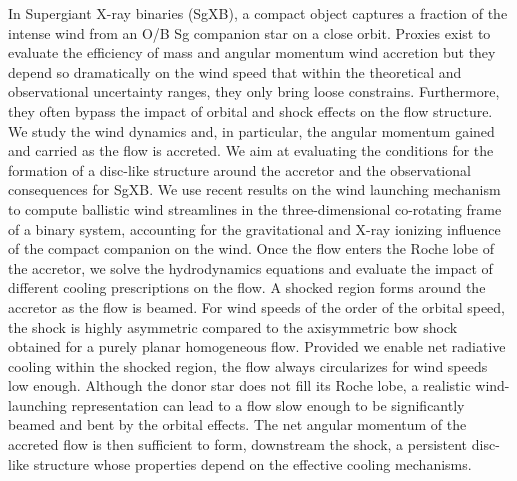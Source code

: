 \documentclass{aa}
\newcommand{\sgx}{SgXB\xspace}
\begin{document}
  \abstract
   {In Supergiant X-ray binaries (\sgx), a compact object captures a fraction of the intense wind from an O/B Sg companion star on a close orbit. Proxies exist to evaluate the efficiency of mass and angular momentum wind accretion but they depend so dramatically on the wind speed that within the theoretical and observational uncertainty ranges, they only bring loose constrains. Furthermore, they often bypass the impact of orbital and shock effects on the flow structure.
}
   {We study the wind dynamics and, in particular, the angular momentum gained and carried as the flow is accreted. We aim at evaluating the conditions for the formation of a disc-like structure around the accretor and the observational consequences for \sgx. 
}
   {We use recent results on the wind launching mechanism to compute ballistic wind streamlines in the three-dimensional co-rotating frame of a binary system, accounting for the gravitational and X-ray ionizing influence of the compact companion on the wind. Once the flow enters the Roche lobe of the accretor, we solve the hydrodynamics equations and evaluate the impact of different cooling prescriptions on the flow.}
   {A shocked region forms around the accretor as the flow is beamed. For wind speeds of the order of the orbital speed, the shock is highly asymmetric compared to the axisymmetric bow shock obtained for a purely planar homogeneous flow. Provided we enable net radiative cooling within the shocked region, the flow always circularizes for wind speeds low enough.
}
   {Although the donor star does not fill its Roche lobe, a realistic wind-launching representation can lead to a flow slow enough to be significantly beamed and bent by the orbital effects. The net angular momentum of the accreted flow is then sufficient to form, downstream the shock, a persistent disc-like structure whose properties depend on the effective cooling mechanisms.
}


   \maketitle
%
\end{document}
